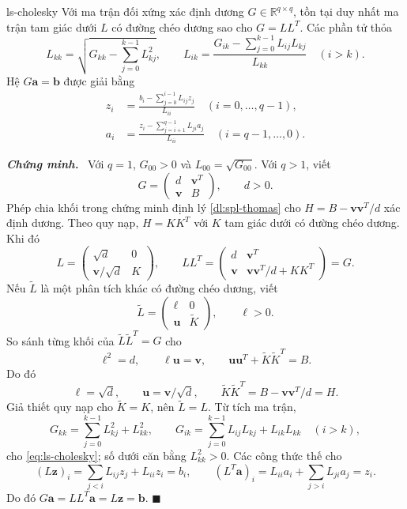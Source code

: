 \documentclass[12pt,a4paper,oneside]{book}
\numberwithin{algorithm}{chapter}
\theoremstyle{definition}
\newenvironment{chungminh}{\par\medskip\noindent\textbf{\textit{\color{mainblue}Chứng minh.}}\ }{\hfill$\blacksquare$\par\medskip}
\newcommand{\R}{\mathbb{R}}
\begin{document}
\begin{dinhly}{}{ls-cholesky}
Với ma trận đối xứng xác định dương $G\in\R^{q\times q}$, tồn tại duy nhất ma trận tam giác dưới $L$ có đường chéo dương sao cho $G=LL^T$. Các phần tử thỏa
\begin{equation}\label{eq:ls-cholesky}
 L_{kk}=\sqrt{G_{kk}-\sum_{j=0}^{k-1}L_{kj}^2},\qquad
 L_{ik}=\frac{G_{ik}-\sum_{j=0}^{k-1}L_{ij}L_{kj}}{L_{kk}}\quad(i>k).
\end{equation}
Hệ $G\mathbf a=\mathbf b$ được giải bằng
\[
\begin{aligned}
 z_i&=\frac{b_i-\sum_{j=0}^{i-1}L_{ij}z_j}{L_{ii}}\quad(i=0,\ldots,q-1),\\
 a_i&=\frac{z_i-\sum_{j=i+1}^{q-1}L_{ji}a_j}{L_{ii}}\quad(i=q-1,\ldots,0).
\end{aligned}
\]
\end{dinhly}
\begin{chungminh}
Với $q=1$, $G_{00}>0$ và $L_{00}=\sqrt{G_{00}}$. Với $q>1$, viết
\[
 G=\begin{pmatrix}d&\mathbf v^T\\\mathbf v&B\end{pmatrix},\qquad d>0.
\]
Phép chia khối trong chứng minh định lý \ref{dl:spl-thomas} cho $H=B-\mathbf v\mathbf v^T/d$ xác định dương. Theo quy nạp, $H=KK^T$ với $K$ tam giác dưới có đường chéo dương. Khi đó
\[
 L=\begin{pmatrix}\sqrt d&0\\\mathbf v/\sqrt d&K\end{pmatrix},\qquad
 LL^T=\begin{pmatrix}d&\mathbf v^T\\\mathbf v&\mathbf v\mathbf v^T/d+KK^T\end{pmatrix}=G.
\]
Nếu $\widetilde L$ là một phân tích khác có đường chéo dương, viết
\[
 \widetilde L=
 \begin{pmatrix}\ell&0\\\mathbf u&\widetilde K\end{pmatrix},
 \qquad \ell>0.
\]
So sánh từng khối của $\widetilde L\widetilde L^T=G$ cho
\[
 \ell^2=d,\qquad \ell\mathbf u=\mathbf v,\qquad
 \mathbf u\mathbf u^T+\widetilde K\widetilde K^T=B.
\]
Do đó
\[
 \ell=\sqrt d,\qquad\mathbf u=\mathbf v/\sqrt d,\qquad
 \widetilde K\widetilde K^T=B-\mathbf v\mathbf v^T/d=H.
\]
Giả thiết quy nạp cho $\widetilde K=K$, nên $\widetilde L=L$. Từ tích ma trận,
\[
 G_{kk}=\sum_{j=0}^{k-1}L_{kj}^2+L_{kk}^2,\qquad
 G_{ik}=\sum_{j=0}^{k-1}L_{ij}L_{kj}+L_{ik}L_{kk}\quad(i>k),
\]
cho \eqref{eq:ls-cholesky}; số dưới căn bằng $L_{kk}^2>0$. Các công thức thế cho
\[
 (L\mathbf z)_i=\sum_{j<i}L_{ij}z_j+L_{ii}z_i=b_i,
 \qquad (L^T\mathbf a)_i=L_{ii}a_i+\sum_{j>i}L_{ji}a_j=z_i.
\]
Do đó $G\mathbf a=LL^T\mathbf a=L\mathbf z=\mathbf b$.
\end{chungminh}
\end{document}
